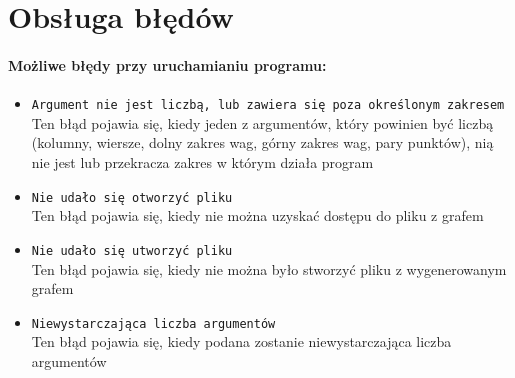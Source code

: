 \documentclass{article}
\begin{document}
\section{Obsługa błędów}
\paragraph{Możliwe błędy przy uruchamianiu programu:}

\begin{itemize}

\item \texttt{Argument nie jest liczbą, lub zawiera się poza określonym zakresem} \\ 
Ten błąd pojawia się, kiedy jeden z argumentów, który powinien być liczbą (kolumny, wiersze, dolny zakres wag, górny zakres wag, pary punktów), nią nie jest lub przekracza zakres w którym działa program

\item \texttt{Nie udało się otworzyć pliku} \\
Ten błąd pojawia się, kiedy nie można uzyskać dostępu do pliku z grafem 

\item \texttt{Nie udało się utworzyć pliku} \\
Ten błąd pojawia się, kiedy nie można było stworzyć pliku z wygenerowanym grafem

\item \texttt{Niewystarczająca liczba argumentów } \\
Ten błąd pojawia się, kiedy podana zostanie niewystarczająca liczba argumentów

\end{itemize}
\end{document}
